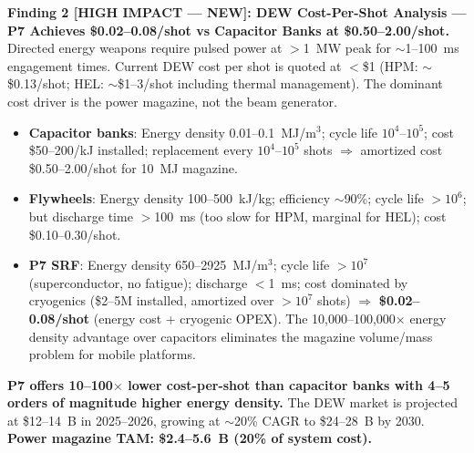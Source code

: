 \documentclass[11pt]{article}
\begin{document}
\begin{tcolorbox}[colback=blue!5!white, colframe=blue!60!black,
  title=\textbf{W4i16 P7 --- Top 5 Findings (Ranked by Impact)}]
\textbf{Finding 2 [HIGH IMPACT --- NEW]: DEW Cost-Per-Shot
Analysis --- P7 Achieves \$0.02--0.08/shot vs Capacitor Banks
at \$0.50--2.00/shot.}
Directed energy weapons require pulsed power at $>$1~MW peak for
$\sim$1--100~ms engagement times. Current DEW cost per shot is
quoted at $<$\$1 (HPM: $\sim$\$0.13/shot; HEL: $\sim$\$1--3/shot
including thermal management). The dominant cost driver is the
power magazine, not the beam generator.
\begin{itemize}[nosep]
  \item \textbf{Capacitor banks}: Energy density 0.01--0.1~MJ/m$^3$;
    cycle life $10^4$--$10^5$; cost \$50--200/kJ installed;
    replacement every $10^4$--$10^5$ shots $\Rightarrow$
    amortized cost \$0.50--2.00/shot for 10~MJ magazine.
  \item \textbf{Flywheels}: Energy density 100--500~kJ/kg;
    efficiency $\sim$90\%; cycle life $>10^6$; but discharge
    time $>$100~ms (too slow for HPM, marginal for HEL);
    cost \$0.10--0.30/shot.
  \item \textbf{P7 SRF}: Energy density 650--2925~MJ/m$^3$;
    cycle life $>10^7$ (superconductor, no fatigue);
    discharge $<$1~ms; cost dominated by cryogenics
    (\$2--5M installed, amortized over $>10^7$ shots)
    $\Rightarrow$ \textbf{\$0.02--0.08/shot} (energy cost
    + cryogenic OPEX). The 10,000--100,000$\times$ energy
    density advantage over capacitors eliminates the
    magazine volume/mass problem for mobile platforms.
\end{itemize}
\textbf{P7 offers 10--100$\times$ lower cost-per-shot than
capacitor banks with 4--5 orders of magnitude higher energy
density.} The DEW market is projected at \$12--14~B in 2025--2026,
growing at $\sim$20\% CAGR to \$24--28~B by 2030.
\textbf{Power magazine TAM: \$2.4--5.6~B (20\% of system cost).}


\end{tcolorbox}
\end{document}
